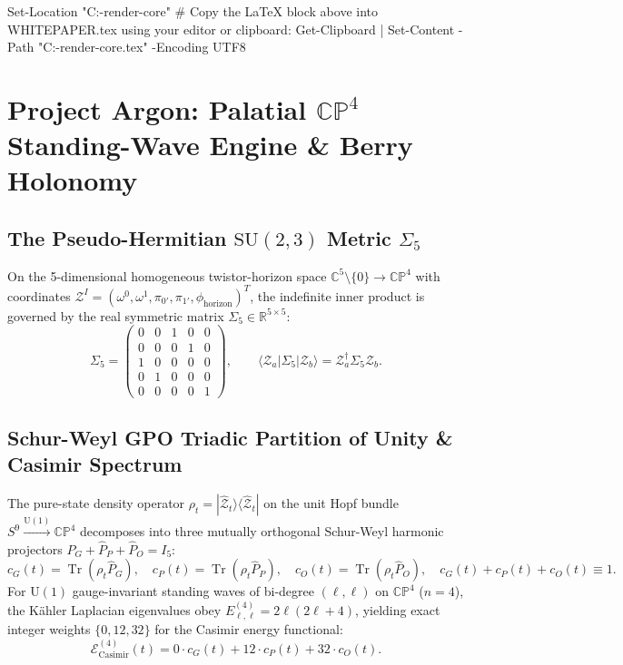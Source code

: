﻿Set-Location "C:\Users\Ivan\twistor-render-core"
# Copy the LaTeX block above into WHITEPAPER.tex using your editor or clipboard:
Get-Clipboard | Set-Content -Path "C:\Users\Ivan\twistor-render-core\WHITEPAPER.tex" -Encoding UTF8

\section{Project Argon: Palatial $\mathbb{CP}^4$ Standing-Wave Engine \& Berry Holonomy}

\subsection{The Pseudo-Hermitian $\mathrm{SU}(2,3)$ Metric $\Sigma_5$}
On the 5-dimensional homogeneous twistor-horizon space $\mathbb{C}^5 \setminus \{0\} \to \mathbb{CP}^4$ with coordinates $\mathcal{Z}^I = (\omega^0, \omega^1, \pi_{0'}, \pi_{1'}, \phi_{\text{horizon}})^T$, the indefinite inner product is governed by the real symmetric matrix $\Sigma_5 \in \mathbb{R}^{5 \times 5}$:
\begin{equation}
\Sigma_5 = \begin{pmatrix}
0 & 0 & 1 & 0 & 0 \\
0 & 0 & 0 & 1 & 0 \\
1 & 0 & 0 & 0 & 0 \\
0 & 1 & 0 & 0 & 0 \\
0 & 0 & 0 & 0 & 1
\end{pmatrix}, \qquad \langle \mathcal{Z}_a | \Sigma_5 | \mathcal{Z}_b \rangle = \mathcal{Z}_a^\dagger \Sigma_5 \mathcal{Z}_b.
\end{equation}

\subsection{Schur-Weyl GPO Triadic Partition of Unity \& Casimir Spectrum}
The pure-state density operator $\rho_t = |\hat{\mathcal{Z}}_t\rangle\langle\hat{\mathcal{Z}}_t|$ on the unit Hopf bundle $S^9 \xrightarrow{\mathrm{U}(1)} \mathbb{CP}^4$ decomposes into three mutually orthogonal Schur-Weyl harmonic projectors $\hat{P}_G + \hat{P}_P + \hat{P}_O = I_5$:
\begin{equation}
c_G(t) = \operatorname{Tr}(\rho_t \hat{P}_G), \quad
c_P(t) = \operatorname{Tr}(\rho_t \hat{P}_P), \quad
c_O(t) = \operatorname{Tr}(\rho_t \hat{P}_O), \quad
c_G(t) + c_P(t) + c_O(t) \equiv 1.
\end{equation}
For $\mathrm{U}(1)$ gauge-invariant standing waves of bi-degree $(\ell, \ell)$ on $\mathbb{CP}^4$ ($n=4$), the Kähler Laplacian eigenvalues obey $E_{\ell,\ell}^{(4)} = 2\ell(2\ell + 4)$, yielding exact integer weights $\{0, 12, 32\}$ for the Casimir energy functional:
\begin{equation}
\mathcal{E}_{\text{Casimir}}^{(4)}(t) = 0 \cdot c_G(t) + 12 \cdot c_P(t) + 32 \cdot c_O(t).
\end{equation}

